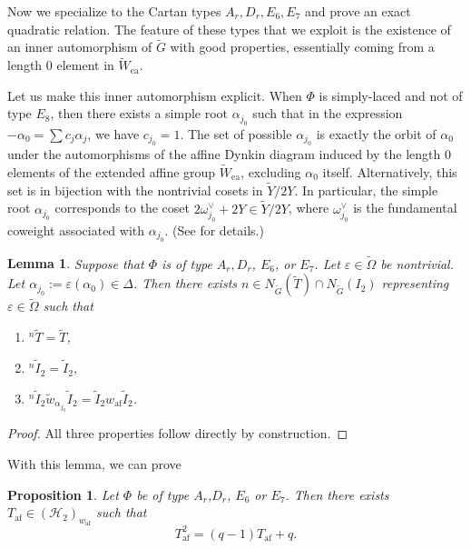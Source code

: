 \documentclass[10pt, letterpaper]{amsart}
\theoremstyle{plain}
\newtheorem{Prop}[equation]{Proposition}
\newtheorem{Lem}[equation]{Lemma}
\theoremstyle{definition}
\numberwithin{equation}{section}
\newcommand{\wt}{\tilde{w}}
\newcommand{\Gt}{\widetilde{G}}
\newcommand{\It}{\widetilde{I}}
\newcommand{\Tt}{\widetilde{T}}
\newcommand{\Yt}{\widetilde{Y}}
\newcommand{\Wt}{\widetilde{W}}
\newcommand{\Omegat}{\widetilde{\Omega}}
\newcommand{\af}{\mathrm{af}}
\newcommand{\ea}{\mathrm{ea}}
\newcommand{\Hcal}{\mathcal{H}}
\begin{document}
Now we specialize to the Cartan types $A_r,D_r,E_{6},E_{7}$ and prove an exact quadratic relation. The feature of these types that we exploit is the existence of an inner automorphism of $\Gt$ with good properties, essentially coming from a length $0$ element in $\Wt_{\ea}$. 

Let us make this inner automorphism explicit. When $\Phi$ is simply-laced and not of type $E_{8}$, then there exists a simple root $\alpha_{j_{0}}$ such that in the expression $-\alpha_{0}=\sum c_{j}\alpha_{j}$, we have $c_{j_{0}}=1$. The set of possible $\alpha_{j_{0}}$ is exactly the orbit of $\alpha_{0}$ under the automorphisms of the affine Dynkin diagram induced by the length $0$ elements of the extended affine group $\Wt_{\ea}$, excluding $\alpha_{0}$ itself. Alternatively, this set is in bijection with the nontrivial cosets in $\Yt/2Y$. In particular, the simple root $\alpha_{j_{0}}$ corresponds to the coset $2\omega_{j_{0}}^{\vee}+2Y\in\Yt/2Y$, where $\omega_{j_0}^\vee$ is the fundamental coweight associated with $\alpha_{j_0}$. (See \cite[Ch.\ 6, \S 2.3, Prop.\ 6]{BourLGLA46} for details.)




\begin{Lem}\label{StabGam2}
	Suppose that $\Phi$ is of type $A_r,D_r$, $E_{6}$, or $E_{7}$. Let $\varepsilon\in\Omegat$ be nontrivial. Let $\alpha_{j_{0}}:=\varepsilon(\alpha_{0})\in \Delta$. Then there exists $n\in N_{\Gt}(\Tt)\cap N_{\Gt}( I_2)$ representing $\varepsilon\in\Omegat$ such that
	\begin{enumerate}
		\item ${}^n\Tt=\Tt$,\label{TInv}
		\item ${}^n\It_2=\It_2$,\label{Gamma2Inv}
		\item ${}^n\It_2\wt_{\alpha_{j_{0}}}\It_2=\It_2w_{\af}\It_2$.\label{Gam2AfDoubCoset}
	\end{enumerate}
\end{Lem}

\begin{proof}
	All three properties follow directly by construction.
\end{proof}

With this lemma, we can prove

\begin{Prop}\label{QuadSimpAff} 
Let $\Phi$ be of type $A_r$,$D_r$, $E_{6}$ or $E_{7}$. Then there exists $T_{\af}\in(\Hcal_{2})_{w_{\af}}$ such that 
\begin{equation*}
		T_{\af}^{2}=(q-1)T_{\af}+q.
	\end{equation*}
\end{Prop}
\end{document}
